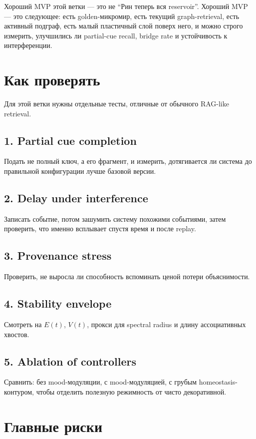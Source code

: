 \begin{workedbox}
Хороший MVP этой ветки — это не ``Рин теперь вся reservoir''. Хороший MVP — это
следующее: есть golden-микромир, есть текущий graph-retrieval, есть активный подграф,
есть малый пластичный слой поверх него, и можно строго измерить, улучшились ли
partial-cue recall, bridge rate и устойчивость к интерференции.
\end{workedbox}

\section{Как проверять}

Для этой ветки нужны отдельные тесты, отличные от обычного RAG-like retrieval.

\subsection*{1. Partial cue completion}
Подать не полный ключ, а его фрагмент, и измерить, дотягивается ли система до
правильной конфигурации лучше базовой версии.

\subsection*{2. Delay under interference}
Записать событие, потом зашумить систему похожими событиями, затем проверить, что
именно всплывает спустя время и после replay.

\subsection*{3. Provenance stress}
Проверить, не выросла ли способность вспоминать ценой потери объяснимости.

\subsection*{4. Stability envelope}
Смотреть на $E(t)$, $V(t)$, прокси для spectral radius и длину ассоциативных хвостов.

\subsection*{5. Ablation of controllers}
Сравнить: без mood-модуляции, с mood-модуляцией, с грубым homeostasis-контуром,
чтобы отделить полезную режимность от чисто декоративной.

\section{Главные риски}

